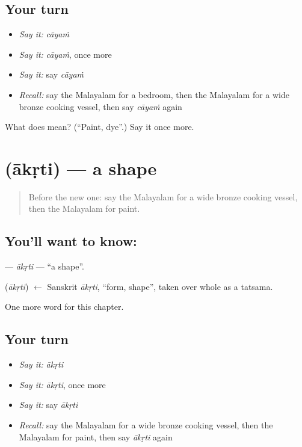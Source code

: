\subsection*{Your turn}
\begin{itemize}
\raggedright
  \item \emph{Say it:} \emph{cāyaṁ}
  \item \emph{Say it:} \emph{cāyaṁ}, once more
  \item \emph{Say it:} say \emph{cāyaṁ}
  \item \emph{Recall:} say the Malayalam for a bedroom, then the Malayalam for a wide bronze cooking vessel, then say \emph{cāyaṁ} again
\end{itemize}

\begin{tcolorbox}[breakable,colback=teal!4,colframe=teal!35!black,title={Before you move on}]
What does  mean? (\textquotedblleft{}Paint, dye\textquotedblright{}.) Say it once more.
\end{tcolorbox}
\section[\texorpdfstring{\ml{ആകൃതി} (ākṛti)}{ആകൃതി (ākṛti)}]{ (ākṛti) — a shape}

\label{lesson:ML-C258-akrti}



\begin{quote}
Before the new one: say the Malayalam for a wide bronze cooking vessel, then the Malayalam for paint.
\end{quote}

\subsection*{You'll want to know: }
\textbf{} — \emph{ākṛti} — \textquotedblleft{}a shape\textquotedblright{}.

\begin{cousinweb}
\textbf{} (\emph{ākṛti}) $\leftarrow$ Sanskrit \emph{ākṛti}, \textquotedblleft{}form, shape\textquotedblright{}, taken over whole as a tatsama.
\end{cousinweb}

\begin{grammarlens}[title={What you've built}]
One more word for this chapter.
\end{grammarlens}

\subsection*{Your turn}
\begin{itemize}
\raggedright
  \item \emph{Say it:} \emph{ākṛti}
  \item \emph{Say it:} \emph{ākṛti}, once more
  \item \emph{Say it:} say \emph{ākṛti}
  \item \emph{Recall:} say the Malayalam for a wide bronze cooking vessel, then the Malayalam for paint, then say \emph{ākṛti} again
\end{itemize}

